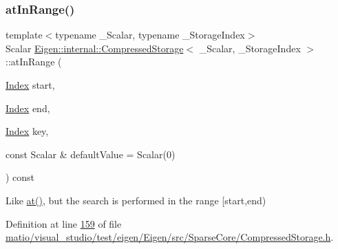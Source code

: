 \subsubsection{\texorpdfstring{at\+In\+Range()}{atInRange()}\hspace{0.1cm}{\footnotesize\ttfamily [2/2]}}
{\footnotesize\ttfamily template$<$typename \+\_\+\+Scalar, typename \+\_\+\+Storage\+Index$>$ \\
Scalar \hyperlink{class_eigen_1_1internal_1_1_compressed_storage}{Eigen\+::internal\+::\+Compressed\+Storage}$<$ \+\_\+\+Scalar, \+\_\+\+Storage\+Index $>$\+::at\+In\+Range (\begin{DoxyParamCaption}\item[{\hyperlink{namespace_eigen_a62e77e0933482dafde8fe197d9a2cfde}{Index}}]{start,  }\item[{\hyperlink{namespace_eigen_a62e77e0933482dafde8fe197d9a2cfde}{Index}}]{end,  }\item[{\hyperlink{namespace_eigen_a62e77e0933482dafde8fe197d9a2cfde}{Index}}]{key,  }\item[{const Scalar \&}]{default\+Value = {\ttfamily Scalar(0)} }\end{DoxyParamCaption}) const\hspace{0.3cm}{\ttfamily [inline]}}

Like \hyperlink{class_eigen_1_1internal_1_1_compressed_storage_a0fe151c0217177fd43df764e8e0cdec2}{at()}, but the search is performed in the range \mbox{[}start,end) 

Definition at line \hyperlink{matio_2visual__studio_2test_2eigen_2_eigen_2src_2_sparse_core_2_compressed_storage_8h_source_l00159}{159} of file \hyperlink{matio_2visual__studio_2test_2eigen_2_eigen_2src_2_sparse_core_2_compressed_storage_8h_source}{matio/visual\+\_\+studio/test/eigen/\+Eigen/src/\+Sparse\+Core/\+Compressed\+Storage.\+h}.

\mbox{\label{class_eigen_1_1internal_1_1_compressed_storage_a8621aa0d1d0e27b025d41b9321968357}} 
